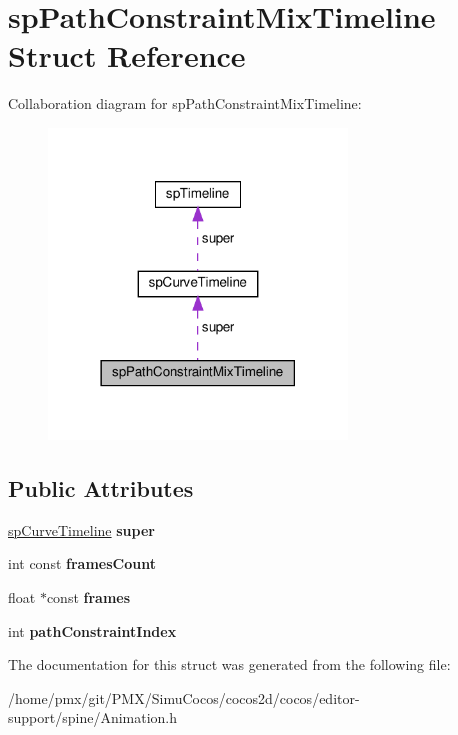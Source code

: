 \hypertarget{structspPathConstraintMixTimeline}{}\section{sp\+Path\+Constraint\+Mix\+Timeline Struct Reference}
\label{structspPathConstraintMixTimeline}


Collaboration diagram for sp\+Path\+Constraint\+Mix\+Timeline\+:
\nopagebreak
\begin{figure}[H]
\begin{center}
\leavevmode
\includegraphics[width=225pt]{structspPathConstraintMixTimeline__coll__graph}
\end{center}
\end{figure}
\subsection*{Public Attributes}
\begin{DoxyCompactItemize}
\item 
\mbox{\label{structspPathConstraintMixTimeline_a15609e4ca77859ae3d19a5c499cb8b09}} 
\hyperlink{structspCurveTimeline}{sp\+Curve\+Timeline} {\bfseries super}
\item 
\mbox{\label{structspPathConstraintMixTimeline_ac2dc99358505660da06fa7d9c4950709}} 
int const {\bfseries frames\+Count}
\item 
\mbox{\label{structspPathConstraintMixTimeline_acf2634ccda01093548eed35cc54e67f5}} 
float $\ast$const {\bfseries frames}
\item 
\mbox{\label{structspPathConstraintMixTimeline_ae119e588fdf63b8e9ea002c2d2ffe18f}} 
int {\bfseries path\+Constraint\+Index}
\end{DoxyCompactItemize}


The documentation for this struct was generated from the following file\+:\begin{DoxyCompactItemize}
\item 
/home/pmx/git/\+P\+M\+X/\+Simu\+Cocos/cocos2d/cocos/editor-\/support/spine/Animation.\+h\end{DoxyCompactItemize}
